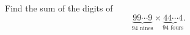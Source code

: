 Find the sum of the digits of
\[
\underbrace{99\cdots9}_{94\text{ nines}}\times\underbrace{44\cdots4}_{94\text{ fours}} .
\]
